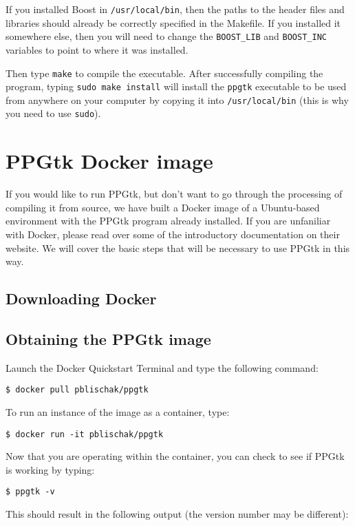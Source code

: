 \documentclass[11pt,english,letterpaper,oneside]{article}
\newcommand{\code}[1]{\hspace{5pt} \texttt{\$ #1}}
\begin{document}
If you installed Boost in \texttt{/usr/local/bin}, then the paths to the header files and libraries should already be correctly specified in the Makefile. If you installed it somewhere else, then you will need to change the \texttt{BOOST\_LIB} and \texttt{BOOST\_INC} variables to point to where it was installed.

Then type \texttt{make} to compile the executable. After successfully compiling the program, typing \texttt{sudo make install} will install the \texttt{ppgtk} executable to be used from anywhere on your computer by copying it into \texttt{/usr/local/bin} (this is why you need to use \texttt{sudo}).

\section{PPGtk Docker image}\label{ppgtk-docker}

If you would like to run PPGtk, but don't want to go through the processing of compiling it from source, we have built a Docker image of a Ubuntu-based environment with the PPGtk program already installed. If you are unfaniliar with Docker, please read over some of the introductory documentation on their website. We will cover the basic steps that will be necessary to use PPGtk in this way.

\subsection{Downloading Docker}

\subsection{Obtaining the PPGtk image}

Launch the Docker Quickstart Terminal and type the following command:

\code{docker pull pblischak/ppgtk}

To run an instance of the image as a container, type:

\code{docker run -it pblischak/ppgtk}

Now that you are operating within the container, you can check to see if PPGtk is working by typing:

\code{ppgtk -v}

This should result in the following output (the version number may be different):
\end{document}
